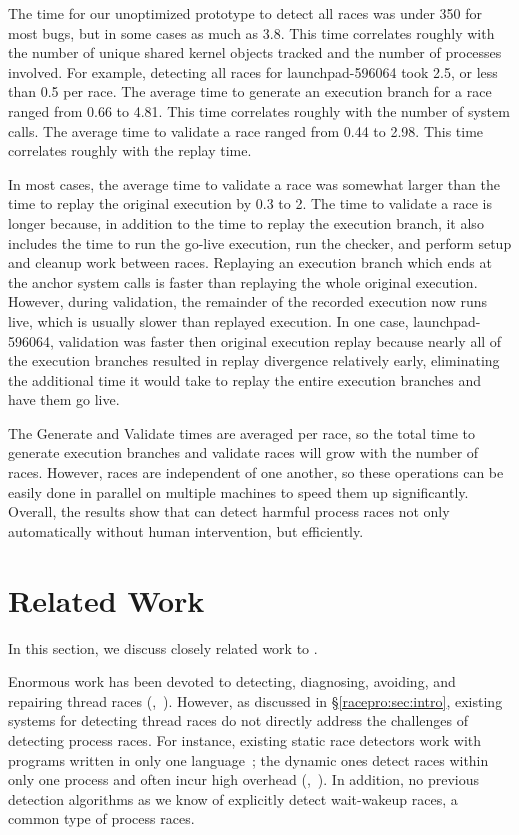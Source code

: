 The time for our unoptimized prototype to detect all races was under
350\ms{} for most bugs, but in some cases as much as 3.8\secs{}.  
This time correlates roughly with the number of unique shared kernel
objects tracked and the number of processes involved.  
For example, detecting all races for launchpad-596064 took 2.5\secs{},
or less than 0.5\ms{} per race.
The average time to generate an execution branch for a race ranged from
0.66\secs{} to 4.81\secs{}.  This time correlates roughly with the
number of system calls.  The average time to validate a race ranged
from 0.44\secs{} to 2.98\secs{}.  This time correlates roughly with
the replay time.  

In most cases, the average time to validate a race was somewhat larger
than the time to replay the original execution by 0.3\secs{} to
2\secs{}. The time to validate a race is longer because, in addition to
the time to replay the execution branch, it also includes the time to
run the go-live execution, run the checker, and perform setup and
cleanup work between races. Replaying an execution branch which ends
at the anchor system calls is faster than replaying the whole original
execution.  However, during validation, the remainder of the recorded
execution now runs live, which is usually slower than replayed
execution. In one case, launchpad-596064, validation was faster then
original execution replay because nearly all of the execution branches
resulted in replay divergence relatively early, eliminating the
additional time it would take to replay the entire execution branches
and have them go live.

The Generate and Validate times are averaged per race, so the total
time to generate execution branches and validate races will grow with
the number of races.  However, races are independent of one another,
so these operations can be easily done in parallel on multiple
machines to speed them up significantly.  Overall, the results show
that \racepro can detect harmful process races not only automatically
without human intervention, but efficiently.

\section{Related Work} \label{racepro:sec:related}

In this section, we discuss closely related work to \racepro.

  Enormous work has been devoted to detecting,
diagnosing, avoiding, and repairing thread races
(\eg,~\cite{racerx:sosp03,chord:pldi06,pinsel:pldi07,racefuzzer:pldi08,wu:loom:osdi10,yu:racetrack:sosp}).
However, as discussed in \S\ref{racepro:sec:intro}, existing systems for detecting
thread races do not directly address the challenges of detecting process
races.  For instance, existing static race detectors work with programs
written in only one language~\cite{racerx:sosp03,chord:pldi06}; the
dynamic ones detect races within only one process and often incur high
overhead (\eg,~\cite{musuvathi:chess:osdi08}).  In addition, no previous
detection algorithms as we know of explicitly detect wait-wakeup races, a
common type of process races.


